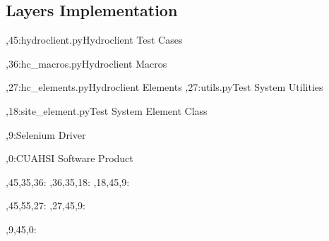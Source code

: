 \documentclass[10pt]{article}
\begin{document}
\subsection{Layers Implementation}
\begin{chart}%
  ,45:{hydroclient.py}{Hydroclient Test Cases}{}

  ,36:{hc\_macros.py}{Hydroclient Macros}{}

  ,27:{hc\_elements.py}{Hydroclient Elements}{}
  ,27:{utils.py}{Test System Utilities}{}

  ,18:{site\_element.py}{Test System Element Class}{}

  ,9:{}{Selenium Driver}{}

  ,0:{}{CUAHSI Software Product}{}

  ,45,35,36:
  ,36,35,18:
  ,18,45,9:

  ,45,55,27:
  ,27,45,9:

  ,9,45,0:



\end{chart}
\end{document}
